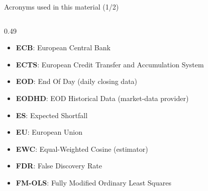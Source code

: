 \begin{frame}{Acronyms used in this material (1/2)}
\begin{columns}[T]
\begin{column}{0.49\textwidth}
\begin{itemize}
    \item \textbf{ECB}: European Central Bank
    \item \textbf{ECTS}: European Credit Transfer and Accumulation System
    \item \textbf{EOD}: End Of Day (daily closing data)
    \item \textbf{EODHD}: EOD Historical Data (market-data provider)
    \item \textbf{ES}: Expected Shortfall
    \item \textbf{EU}: European Union
    \item \textbf{EWC}: Equal-Weighted Cosine (estimator)
    \item \textbf{FDR}: False Discovery Rate
    \item \textbf{FM-OLS}: Fully Modified Ordinary Least Squares
\end{itemize}
\end{column}
\end{columns}
\end{frame}
